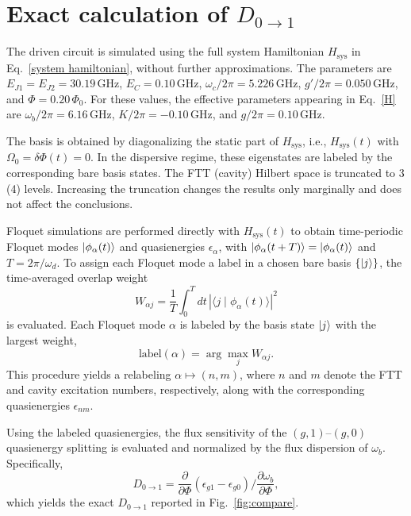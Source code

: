 \section{Exact calculation of $D_{0\rightarrow 1}$}
\label{app:numerics}
The driven circuit is simulated using the full system Hamiltonian \(H_{\mathrm{sys}}\) in Eq.~\eqref{system hamiltonian}, without further approximations.
The parameters are \(E_{J1}=E_{J2}=30.19\,\mathrm{GHz}\), \(E_C=0.10\,\mathrm{GHz}\), \(\omega_c/2\pi=5.226\,\mathrm{GHz}\), \(g'/2\pi=0.050\,\mathrm{GHz}\), and \(\Phi=0.20\,\Phi_0\).
For these values, the effective parameters appearing in Eq.~\eqref{H} are \(\omega_b/2\pi=6.16\,\mathrm{GHz}\), \(K/2\pi=-0.10\,\mathrm{GHz}\), and \(g/2\pi=0.10\,\mathrm{GHz}\).

The basis is obtained by diagonalizing the static part of \(H_{\mathrm{sys}}\), i.e., \(H_{\mathrm{sys}}(t)\) with \(\Omega_0=\delta\Phi(t)=0\).
In the dispersive regime, these eigenstates are labeled by the corresponding bare basis states.
The FTT (cavity) Hilbert space is truncated to 3 (4) levels. Increasing the truncation changes the results only marginally and does not affect the conclusions.

Floquet simulations are performed directly with \(H_{\mathrm{sys}}(t)\) to obtain time-periodic Floquet modes \(|\phi_\alpha(t)\rangle\) and quasienergies \(\epsilon_\alpha\), with \(|\phi_\alpha(t+T)\rangle=|\phi_\alpha(t)\rangle\) and \(T=2\pi/\omega_d\).
To assign each Floquet mode a label in a chosen bare basis \(\{|j\rangle\}\), the time-averaged overlap weight
\begin{equation}
W_{\alpha j}
= \frac{1}{T} \int_{0}^{T} dt \,
\left| \langle j \mid \phi_\alpha(t) \rangle \right|^2
\end{equation}
is evaluated.
Each Floquet mode \(\alpha\) is labeled by the basis state \(|j\rangle\) with the largest weight,
\begin{equation}
\mathrm{label}(\alpha)=\arg\max_j W_{\alpha j}.
\end{equation}
This procedure yields a relabeling \(\alpha\mapsto(n,m)\), where \(n\) and \(m\) denote the FTT and cavity excitation numbers, respectively, along with the corresponding quasienergies \(\epsilon_{nm}\).

Using the labeled quasienergies, the flux sensitivity of the \((g,1)\)--\((g,0)\) quasienergy splitting is evaluated and normalized by the flux dispersion of \(\omega_b\).
Specifically,
\begin{equation}
D_{0\rightarrow1}=\frac{\partial}{\partial\Phi}\!\left(\epsilon_{g1}-\epsilon_{g0}\right)\bigg/\frac{\partial \omega_b}{\partial\Phi},
\end{equation}
which yields the exact \(D_{0\rightarrow1}\) reported in Fig.~\ref{fig:compare}.